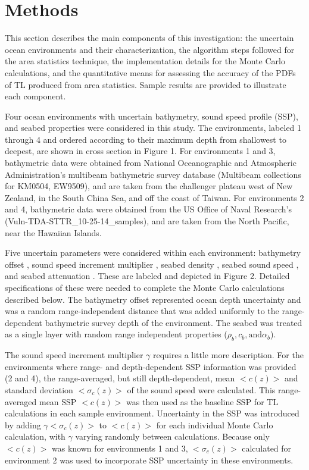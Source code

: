 \section{Methods} \label{section:asuq_astats_methods}
This section describes the main components of this investigation: the
uncertain ocean environments and their characterization, the algorithm
steps followed for the area statistics technique, the implementation
details for the Monte Carlo calculations, and the quantitative means
for assessing the accuracy of the PDFs of TL produced from area
statistics. Sample results are provided to illustrate each component.

Four ocean environments with uncertain bathymetry, sound speed profile
(SSP), and seabed properties were considered in this study. The
environments, labeled 1 through 4 and ordered according to their
maximum depth from shallowest to deepest, are shown in cross section
in Figure 1. For environments 1 and 3, bathymetric data were obtained
from National Oceanographic and Atmospheric Administration’s multibeam
bathymetric survey database \nocite{multibeam_km0504,multibeam_ew9509}
(Multibeam collections for KM0504, EW9509), and are taken from the
challenger plateau west of New Zealand, in the South China Sea, and
off the coast of Taiwan. For environments 2 and 4, bathymetric data
were obtained from the US Office of Naval Research’s
(Vuln-TDA-STTR\_10-25-14\_samples), and are taken from the North
Pacific, near the Hawaiian Islands.

Five uncertain parameters were considered within each environment:
bathymetry offset , sound speed increment multiplier , seabed density
, seabed sound speed , and seabed attenuation . These are labeled and
depicted in Figure 2. Detailed specifications of these were needed to
complete the Monte Carlo calculations described below. The bathymetry
offset represented ocean depth uncertainty and was a random
range-independent distance that was added uniformly to the
range-dependent bathymetric survey depth of the environment. The
seabed was treated as a single layer with random range independent
properties ($\rho_b, c_b, \text{and} \alpha_b$).

The sound speed increment multiplier $\gamma$ requires a little more
description. For the environments where range- and depth-dependent SSP
information was provided (2 and 4), the range-averaged, but still
depth-dependent, mean $<c(z)>$ and standard deviation $<\sigma_c(z)>$ of the sound
speed were calculated. This range-averaged mean SSP $<c(z)>$ was then used
as the baseline SSP for TL calculations in each sample
environment. Uncertainty in the SSP was introduced by adding $\gamma<\sigma_c(z)>$ to
$<c(z)>$ for each individual Monte Carlo calculation, with $\gamma$ varying
randomly between calculations. Because only $<c(z)>$ was known for
environments 1 and 3, $<\sigma_c(z)>$ calculated for environment 2 was used to
incorporate SSP uncertainty in these environments.

